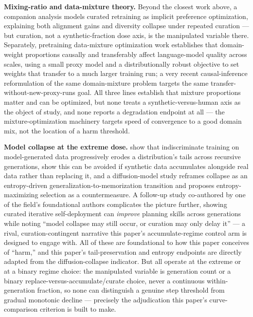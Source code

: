 \documentclass[11pt]{article}
\begin{document}
\textbf{Mixing-ratio and data-mixture theory.} Beyond the closest work above, a companion analysis \citep{CuratedSelfConsuming} models curated retraining as implicit preference optimization, explaining both alignment gains and diversity collapse under repeated curation --- but curation, not a synthetic-fraction dose axis, is the manipulated variable there. Separately, pretraining data-mixture optimization work \citep{DoReMi} establishes that domain-weight proportions causally and transferably affect language-model quality across scales, using a small proxy model and a distributionally robust objective to set weights that transfer to a much larger training run; a very recent causal-inference reformulation of the same domain-mixture problem \citep{CAUSALMIX1104} targets the same transfer-without-new-proxy-runs goal. All three lines establish that mixture proportions matter and can be optimized, but none treats a synthetic-versus-human axis as the object of study, and none reports a degradation endpoint at all --- the mixture-optimization machinery targets speed of convergence to a good domain mix, not the location of a harm threshold.

\textbf{Model collapse at the extreme dose.} \citet{ShumailovCurseRecursion} show that indiscriminate training on model-generated data progressively erodes a distribution's tails across recursive generations, \citet{GerstgrasserAccumulate} show this can be avoided if synthetic data accumulates alongside real data rather than replacing it, and a diffusion-model study \citep{CloserLookCollapse} reframes collapse as an entropy-driven generalization-to-memorization transition and proposes entropy-maximizing selection as a countermeasure. A follow-up study co-authored by one of the field's foundational authors \citep{IterativeDeploymentImpro4940} complicates the picture further, showing curated iterative self-deployment can \emph{improve} planning skills across generations while noting ``model collapse may still occur, or curation may only delay it'' --- a rival, curation-contingent narrative this paper's accumulate-regime control arm is designed to engage with. All of these are foundational to how this paper conceives of ``harm,'' and this paper's tail-preservation and entropy endpoints are directly adapted from the diffusion-collapse indicator. But all operate at the extreme or at a binary regime choice: the manipulated variable is generation count or a binary replace-versus-accumulate/curate choice, never a continuous within-generation fraction, so none can distinguish a genuine step threshold from gradual monotonic decline --- precisely the adjudication this paper's curve-comparison criterion is built to make.
\end{document}
